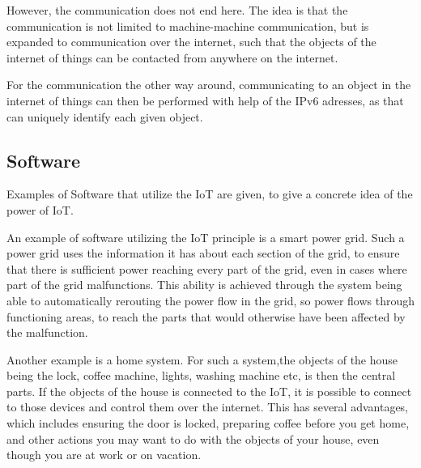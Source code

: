 However, the communication does not end here.
The idea is that the communication is not limited to machine-machine communication, but is expanded to communication over the internet, such that the objects of the internet of things can be contacted from anywhere on the internet.

For the communication the other way around, communicating to an object in the internet of things can then be performed with help of the IPv6 adresses, as that can uniquely identify each given object.

\subsection{Software}
Examples of Software that utilize the IoT are given, to give a concrete idea of the power of IoT.

An example of software utilizing the IoT principle is a smart power grid.
Such a power grid uses the information it has about each section of the grid, to ensure that there is sufficient power reaching every part of the grid, even in cases where part of the grid malfunctions.
This ability is achieved through the system being able to automatically rerouting the power flow in the grid, so power flows through functioning areas, to reach the parts that would otherwise have been affected by the malfunction.

Another example is a home system.
For such a system,the objects of the house being the lock, coffee machine, lights, washing machine etc, is then the central parts.
If the objects of the house is connected to the IoT, it is possible to connect to those devices and control them over the internet.
This has several advantages, which includes ensuring the door is locked, preparing coffee before you get home, and other actions you may want to do with the objects of your house, even though you are at work or on vacation.